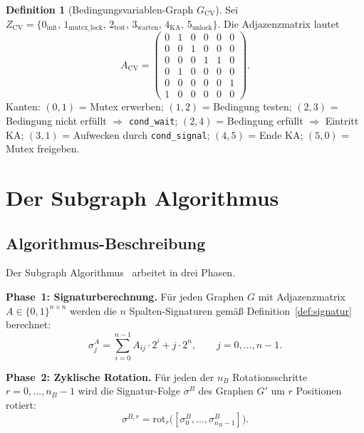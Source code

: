 ﻿\documentclass[a4paper,12pt]{article}
\theoremstyle{definition}
\newtheorem{definition}{Definition}
\begin{document}
\begin{definition}[Bedingungsvariablen-Graph $G_{\mathrm{CV}}$]
  \label{def:cv}
  Sei $Z_{\mathrm{CV}} = \{0_{\mathrm{init}},\, 1_{\mathrm{mutex\_lock}},\,
  2_{\mathrm{test}},\, 3_{\mathrm{warten}},\, 4_{\mathrm{KA}},\, 5_{\mathrm{unlock}}\}$.
  Die Adjazenzmatrix lautet
  \[
    A_{\mathrm{CV}} =
    \begin{pmatrix}
      0 & 1 & 0 & 0 & 0 & 0 \\
      0 & 0 & 1 & 0 & 0 & 0 \\
      0 & 0 & 0 & 1 & 1 & 0 \\
      0 & 1 & 0 & 0 & 0 & 0 \\
      0 & 0 & 0 & 0 & 0 & 1 \\
      1 & 0 & 0 & 0 & 0 & 0
    \end{pmatrix}.
  \]
  Kanten: $(0,1)$ = Mutex erwerben; $(1,2)$ = Bedingung testen;
  $(2,3)$ = Bedingung nicht erfüllt $\Rightarrow$ \texttt{cond\_wait};
  $(2,4)$ = Bedingung erfüllt $\Rightarrow$ Eintritt KA;
  $(3,1)$ = Aufwecken durch \texttt{cond\_signal};
  $(4,5)$ = Ende KA; $(5,0)$ = Mutex freigeben.
\end{definition}

\section{Der Subgraph Algorithmus}
\label{sec:algorithmus}

\subsection{Algorithmus-Beschreibung}

Der Subgraph Algorithmus~\cite{epp2026subgraph} arbeitet in drei Phasen.

\textbf{Phase~1: Signaturberechnung.}
Für jeden Graphen $G$ mit Adjazenzmatrix $A \in \{0,1\}^{n \times n}$
werden die $n$ Spalten-Signaturen gemäß Definition~\ref{def:signatur}
berechnet:
\[
  \sigma_j^A = \sum_{i=0}^{n-1} A_{ij} \cdot 2^i + j \cdot 2^n,
  \qquad j = 0, \ldots, n-1.
\]

\textbf{Phase~2: Zyklische Rotation.}
Für jeden der $n_B$ Rotationsschritte $r = 0, \ldots, n_B - 1$ wird die
Signatur-Folge $\sigma^B$ des Graphen $G'$ um $r$ Positionen rotiert:
\[
  \sigma^{B,r} = \mathrm{rot}_r\bigl([\sigma^B_0, \ldots, \sigma^B_{n_B-1}]\bigr).
\]
\end{document}
